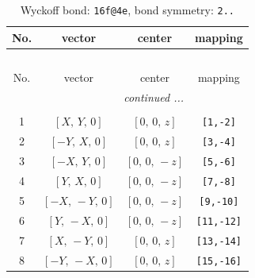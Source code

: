 \documentclass[fleqn,8pt]{jsarticle}
\begin{document}
\begin{longtable}{cccc}
\caption{Wyckoff bond: {\tt 16f@4e}, bond symmetry: {\tt 2..}}
 \\
 \hline \hline
No. & vector & center & mapping \\ \hline \endfirsthead

\multicolumn{3}{l}{\tablename\ \thetable{}} \\
 \hline \hline
No. & vector & center & mapping \\ \hline \endhead

 \hline \hline
\multicolumn{3}{r}{\footnotesize\it continued ...} \\ \endfoot

 \hline \hline
\multicolumn{3}{r}{} \\ \endlastfoot

1 & $\left[ X,\, Y,\, 0 \right]$ & $\left[ 0,\, 0,\, z \right]$ & {\tt [1,-2]} \\ \hline
2 & $\left[ - Y,\, X,\, 0 \right]$ & $\left[ 0,\, 0,\, z \right]$ & {\tt [3,-4]} \\ \hline
3 & $\left[ - X,\, Y,\, 0 \right]$ & $\left[ 0,\, 0,\, - z \right]$ & {\tt [5,-6]} \\ \hline
4 & $\left[ Y,\, X,\, 0 \right]$ & $\left[ 0,\, 0,\, - z \right]$ & {\tt [7,-8]} \\ \hline
5 & $\left[ - X,\, - Y,\, 0 \right]$ & $\left[ 0,\, 0,\, - z \right]$ & {\tt [9,-10]} \\ \hline
6 & $\left[ Y,\, - X,\, 0 \right]$ & $\left[ 0,\, 0,\, - z \right]$ & {\tt [11,-12]} \\ \hline
7 & $\left[ X,\, - Y,\, 0 \right]$ & $\left[ 0,\, 0,\, z \right]$ & {\tt [13,-14]} \\ \hline
8 & $\left[ - Y,\, - X,\, 0 \right]$ & $\left[ 0,\, 0,\, z \right]$ & {\tt [15,-16]} \\
\end{longtable}
\renewcommand{\arraystretch}{1.2}
\end{document}
